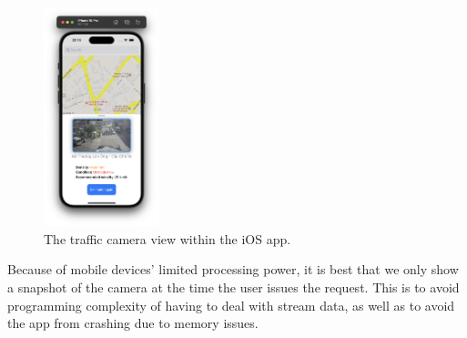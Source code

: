 \begin{figure}[H]
    \centering
    \includegraphics[width=0.3\textwidth]{assets/images/Implementation/hcmut_trafficview.png}
    \caption{The traffic camera view within the iOS app.}
    \label{fig:trafficview_ios}
\end{figure}

Because of mobile devices' limited processing power, it is best that we only show a snapshot of the camera at the time the user issues the request. This is to avoid programming complexity of having to deal with stream data, as well as to avoid the app from crashing due to memory issues.